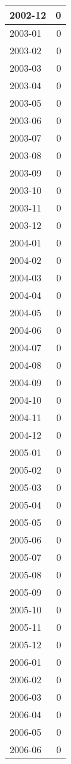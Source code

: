 \documentclass[
]{article}
\begin{document}
\begin{table}[H]
\begin{tabular}{l|r}
\hline
2002-12 & 0\\
\hline
2003-01 & 0\\
\hline
2003-02 & 0\\
\hline
2003-03 & 0\\
\hline
2003-04 & 0\\
\hline
2003-05 & 0\\
\hline
2003-06 & 0\\
\hline
2003-07 & 0\\
\hline
2003-08 & 0\\
\hline
2003-09 & 0\\
\hline
2003-10 & 0\\
\hline
2003-11 & 0\\
\hline
2003-12 & 0\\
\hline
2004-01 & 0\\
\hline
2004-02 & 0\\
\hline
2004-03 & 0\\
\hline
2004-04 & 0\\
\hline
2004-05 & 0\\
\hline
2004-06 & 0\\
\hline
2004-07 & 0\\
\hline
2004-08 & 0\\
\hline
2004-09 & 0\\
\hline
2004-10 & 0\\
\hline
2004-11 & 0\\
\hline
2004-12 & 0\\
\hline
2005-01 & 0\\
\hline
2005-02 & 0\\
\hline
2005-03 & 0\\
\hline
2005-04 & 0\\
\hline
2005-05 & 0\\
\hline
2005-06 & 0\\
\hline
2005-07 & 0\\
\hline
2005-08 & 0\\
\hline
2005-09 & 0\\
\hline
2005-10 & 0\\
\hline
2005-11 & 0\\
\hline
2005-12 & 0\\
\hline
2006-01 & 0\\
\hline
2006-02 & 0\\
\hline
2006-03 & 0\\
\hline
2006-04 & 0\\
\hline
2006-05 & 0\\
\hline
2006-06 & 0\\

\end{tabular}
\end{table}
\end{document}
